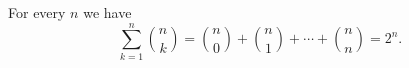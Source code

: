 \begin{thm}
\label{thm:BinomSum}
For every $n$ we have
\begin{equation}
\label{eqn:SumBinCoeff}
\sum_{k=1}^n \binom{n}{k} = \binom{n}{0} + \binom{n}{1} + \cdots + \binom{n}{n} = 2^n.
\end{equation}
\end{thm}